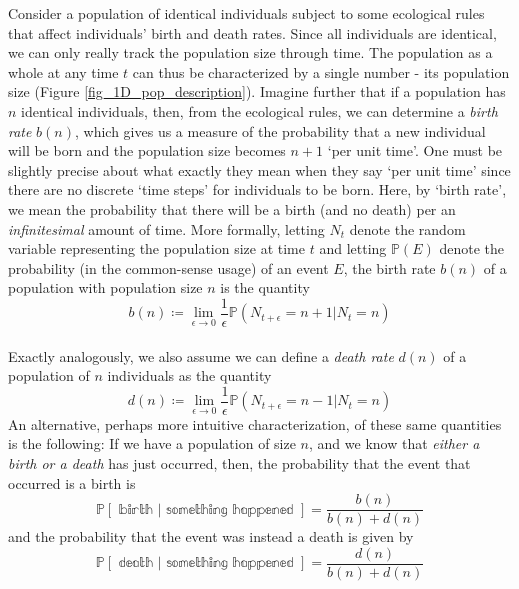 Consider a population of identical individuals subject to some ecological rules that affect individuals' birth and death rates. Since all individuals are identical, we can only really track the population size through time. The population as a whole at any time $t$ can thus be characterized by a single number - its population size (Figure \ref{fig_1D_pop_description}). Imagine further that if a population has $n$ identical individuals, then, from the ecological rules, we can determine a \emph{birth rate} $b(n)$, which gives us a measure of the probability that a new individual will be born and the population size becomes $n+1$ `per unit time'. One must be slightly precise about what exactly they mean when they say `per unit time' since there are no discrete `time steps' for individuals to be born. Here, by `birth rate', we mean the probability that there will be a birth (and no death) per an \emph{infinitesimal} amount of time. More formally, letting $N_t$ denote the random variable representing the population size at time $t$ and letting $\mathbb{P}(E)$ denote the probability (in the common-sense usage) of an event $E$, the birth rate $b(n)$ of a population with population size $n$ is the quantity
\begin{equation}
\label{1D_birthrate_defn}
b(n) \coloneqq \lim_{\epsilon \to 0}\frac{1}{\epsilon}\mathbb{P}\left(N_{t+\epsilon}=n+1 | N_{t}=n\right)
\end{equation}
\\
Exactly analogously, we also assume we can define a \emph{death rate} $d(n)$ of a population of $n$ individuals as the quantity
\begin{equation}
\label{1D_deathrate_defn}
d(n) \coloneqq \lim_{\epsilon \to 0}\frac{1}{\epsilon}\mathbb{P}\left(N_{t+\epsilon}=n-1 | N_{t}=n\right)
\end{equation}
An alternative, perhaps more intuitive characterization, of these same quantities is the following: If we have a population of size $n$, and we know that \emph{either a birth or a death} has just occurred, then, the probability that the event that occurred is a birth is
\begin{equation*}
    \mathbb{P[\textrm{ birth } | \textrm{ something happened }]} = \frac{b(n)}{b(n)+d(n)}
\end{equation*}
and the probability that the event was instead a death is given by
\begin{equation*}
    \mathbb{P[\textrm{ death } | \textrm{ something happened }]} = \frac{d(n)}{b(n)+d(n)}
\end{equation*}
